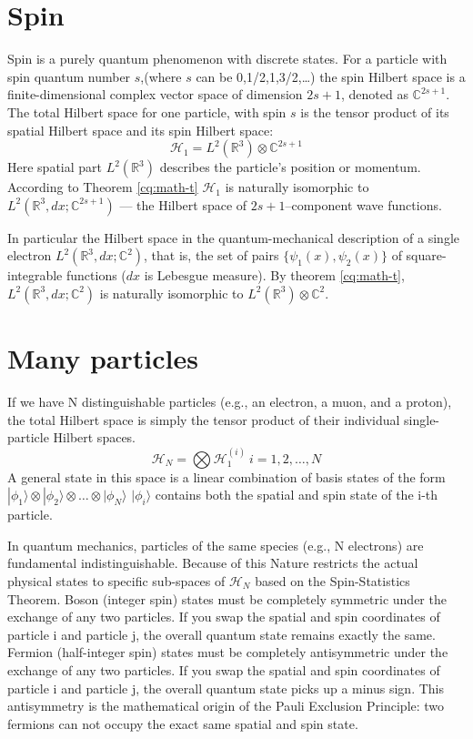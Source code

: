 \section{Spin}
\label{cq:spin}

 Spin is a purely quantum phenomenon with discrete states. 
 For a particle with spin quantum number $ s $,(where $s$ can be 0,1/2,1,3/2,\ldots)
 the spin Hilbert space is a 
 finite-dimensional complex vector space of dimension $2 s+1$, denoted 
 as $\mathbb{C}^{2 s+1}$.
The total Hilbert space for one particle, 
with spin $s$ is the tensor product of its spatial Hilbert space and its spin Hilbert space:
\begin{equation}
   \label {cq:sps}
    \mathcal{H}_1=L^2(\mathbb{R}^3)\otimes \mathbb{C}^{2 s+1}
\end{equation}
Here spatial part $L^2(\mathbb{R}^3)$ describes the particle's position or momentum. 
According to Theorem \ref{cq:math-t} $\mathcal{H}_1$ is naturally isomorphic to
$L^2(\mathbb{R}^3, dx; \mathbb{C}^{2 s+1})$ --- the Hilbert space of $ 2 s+1 $--component
wave functions.

In particular the Hilbert space in the quantum-mechanical description 
of a single electron $L^2(\mathbb{R}^3, dx; \mathbb{C}^2)$, that is, the 
set of pairs $\{\psi_1(x),\psi_2(x)\}$ of 
square-integrable functions ($dx$ is Lebesgue 
measure). By theorem \ref{cq:math-t}, 
$L^2(\mathbb{R}^3, dx; \mathbb{C}^2)$ is naturally isomorphic to
$ L^2(\mathbb{R}^3)\otimes \mathbb{C}^2 $.

\section{Many particles}
\label{cq-mp}

If we have N distinguishable particles (e.g., an electron, a muon, and a proton),
the total Hilbert space is simply the tensor product of their individual 
single-particle Hilbert spaces.
\begin{equation}
   \label {cq-mp-d}
    \mathcal{H}_N=\bigotimes \mathcal{H}_1^{(i)} \ i=1,2,\ldots,N
\end{equation}
A general state in this space is a linear combination of basis states of the form
$ |{\phi_1}\rangle \otimes |{\phi_2}\rangle \otimes \ldots \otimes |{\phi_N}\rangle $
$ |{\phi_i}\rangle $ contains both the spatial and spin state of the i-th particle.

In quantum mechanics, particles of the same species (e.g., N electrons) 
are fundamental indistinguishable.
Because of this Nature restricts the actual physical states to specific sub-spaces of 
$\mathcal{H}_N$  based on the Spin-Statistics Theorem.
 Boson (integer spin) states 
 must be completely symmetric under the exchange of any two particles.
If you swap the spatial and spin coordinates of particle i and particle j,
the overall quantum state remains exactly the same.
 Fermion (half-integer spin) states
 must be completely antisymmetric under the exchange of any two particles.
If you swap the spatial and spin coordinates of particle i and particle j, 
the overall quantum state picks up a minus sign.
This antisymmetry is the mathematical origin of the Pauli Exclusion Principle:
two fermions can not occupy the exact same spatial and spin state.


